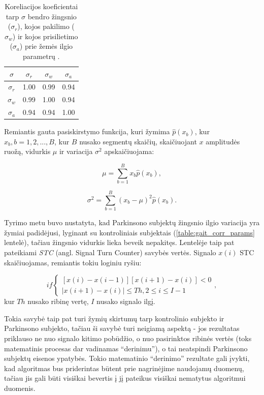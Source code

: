 \documentclass[]{vgtuef}
\begin{document}
\begin{table}[b]
  \renewcommand{\arraystretch}{1.3}
  \centering
  \caption{Koreliacijos koeficientai tarp $\sigma$ bendro žingsnio ($\sigma_r$),
    kojos pakilimo ($\sigma_w$) ir kojos prisilietimo ($\sigma_a$)
    prie žemės ilgio parametrų \cite{5280353}.}
  \label{table:stance_swing_string_corr}
  \begin{tabular}{|c|c|c|c|} \hline
    $\sigma$ & $\sigma_r$ & $\sigma_w$ & $\sigma_a$ \\ \hline
    $\sigma_r$ & 1.00 & 0.99 & 0.94 \\ \hline
    $\sigma_w$ & 0.99 & 1.00 & 0.94 \\ \hline
    $\sigma_a$ & 0.94 & 0.94 & 1.00 \\ \hline
  \end{tabular}
\end{table}

Remiantis gauta pasiskirstymo funkcija, kuri žymima  $\hat{p}(x_b)$, kur $x_b, b = 1, 2, ..., B$, kur $B$ nusako segmentų skaičių, skaičiuojant $x$ amplitudės ruožą, vidurkis $\mu$ ir variacija $\sigma^2$ apskaičiuojama:

\begin{equation}
\mu = \sum_{b=1}^{B} x_b \hat{p}(x_b),
\end{equation}

\begin{equation}
\sigma^2 = \sum_{b=1}^{B} (x_b - \mu)^2 \hat{p}(x_b).
\end{equation}

Tyrimo metu buvo nustatyta, kad Parkinsono subjektų žingsnio ilgio variacija yra žymiai padidėjusi, lyginant su kontroliniais subjektais (\ref{table:gait_corr_params} lentelė), tačiau žingsnio vidurkis lieka beveik nepakitęs. Lentelėje taip pat pateikiami \textit{STC} (angl. Signal Turn Counter) savybės vertės. Signalo $x(i)$ STC skaičiuojamas, remiantis tokiu loginiu ryšiu:

\begin{equation}
 if \left\{ \begin{array}{l}
 	[x(i)-x(i-1)][x(i+1)-x(i)] < 0 \\
 	|x(i+1)-x(i)| \leq Th, 2 \leq i \leq I-1
 \end{array} \right. ,
\end{equation}
kur $Th$ nusako ribinę vertę, $I$ nusako signalo ilgį.

Tokia savybė taip pat turi žymių skirtumų tarp kontrolinio subjekto ir Parkinsono subjekto, tačiau ši savybė turi neigiamą aspektą - jos rezultatas priklauso ne nuo signalo kitimo pobūdžio, o nuo pasirinktos ribinės vertės (toks matematinis procesas dar vadinamas ``derinimu''), o tai neatspindi Parkinsono subjektų eisenos ypatybės. Tokio matematinio ``derinimo'' rezultate gali įvykti, kad algoritmas bus priderintas būtent prie nagrinėjime naudojamų duomenų, tačiau jis gali būti visiškai bevertis į jį pateikus visiškai nematytus algoritmui duomenis.
\end{document}
